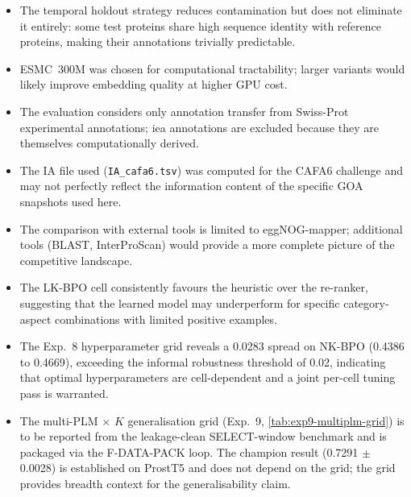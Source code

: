 \begin{itemize}
  \item The temporal holdout strategy reduces contamination but does not
    eliminate it entirely: some test proteins share high sequence identity with
    reference proteins, making their annotations trivially predictable.
  \item ESMC~300M was chosen for computational tractability; larger variants
    would likely improve embedding quality at higher GPU cost.
  \item The evaluation considers only annotation transfer from Swiss-Prot
    experimental annotations; \gls{iea} annotations are excluded because they are
    themselves computationally derived.
  \item The IA file used (\texttt{IA\_cafa6.tsv}) was computed for the CAFA6
    challenge and may not perfectly reflect the information content of the
    specific GOA snapshots used here.
  \item The comparison with external tools is limited to eggNOG-mapper;
    additional tools (BLAST, InterProScan) would provide a more complete
    picture of the competitive landscape.
  \item The LK-BPO cell consistently favours the heuristic over the re-ranker,
    suggesting that the learned model may underperform for specific
    category-aspect combinations with limited positive examples.
  \item The Exp.~8 hyperparameter grid reveals a 0.0283 spread on NK-BPO
    (0.4386 to 0.4669), exceeding the informal robustness threshold of 0.02,
    indicating that optimal hyperparameters are cell-dependent and a joint
    per-cell tuning pass is warranted.
  \item The multi-PLM $\times$ $K$ generalisation grid (Exp.~9,
    \cref{tab:exp9-multiplm-grid}) is to be reported from the leakage-clean
    SELECT-window benchmark and is packaged via the F-DATA-PACK loop. The
    champion result (0.7291 $\pm$ 0.0028) is established on ProstT5 and does
    not depend on the grid; the grid provides breadth context for the
    generalisability claim.
\end{itemize}
